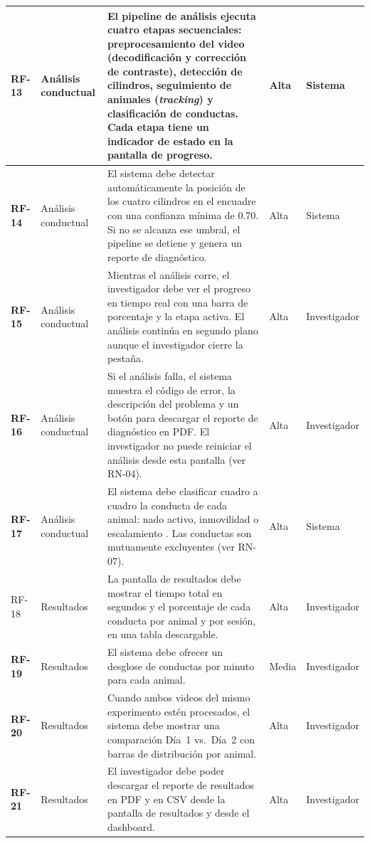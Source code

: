 \begin{longtable}{|>{\bfseries}p{1.1cm}|p{2.0cm}|p{6.7cm}|p{1.3cm}|p{1.7cm}|}
RF-13 & Análisis conductual
      & El pipeline de análisis ejecuta cuatro etapas secuenciales: preprocesamiento
        del video (decodificación y corrección de contraste), detección de cilindros,
        seguimiento de animales (\textit{tracking}) y clasificación de conductas.
        Cada etapa tiene un indicador de estado en la pantalla de progreso.
      & Alta & Sistema \\
\hline
RF-14 & Análisis conductual
      & El sistema debe detectar automáticamente la posición de los cuatro cilindros
        en el encuadre con una confianza mínima de 0.70. Si no se alcanza ese umbral,
        el pipeline se detiene y genera un reporte de diagnóstico.
      & Alta & Sistema \\
\hline
RF-15 & Análisis conductual
      & Mientras el análisis corre, el investigador debe ver el progreso en tiempo
        real con una barra de porcentaje y la etapa activa. El análisis continúa
        en segundo plano aunque el investigador cierre la pestaña.
      & Alta & Investigador \\
\hline
RF-16 & Análisis conductual
      & Si el análisis falla, el sistema muestra el código de error, la descripción
        del problema y un botón para descargar el reporte de diagnóstico en PDF.
        El investigador no puede reiniciar el análisis desde esta pantalla (ver RN-04).
      & Alta & Investigador \\
\hline
RF-17 & Análisis conductual
      & El sistema debe clasificar cuadro a cuadro la conducta de cada animal: nado
        activo, inmovilidad o escalamiento \cite{armario2021}. Las conductas son
        mutuamente excluyentes (ver RN-07).
      & Alta & Sistema \\
\hline

RF-18 & Resultados
      & La pantalla de resultados debe mostrar el tiempo total en segundos y el
        porcentaje de cada conducta por animal y por sesión, en una tabla
        descargable.
      & Alta & Investigador \\
\hline
RF-19 & Resultados
      & El sistema debe ofrecer un desglose de conductas por minuto para cada animal.
      & Media & Investigador \\
\hline
RF-20 & Resultados
      & Cuando ambos videos del mismo experimento estén procesados, el sistema debe
        mostrar una comparación Día~1 vs.\ Día~2 con barras de distribución por
        animal.
      & Alta & Investigador \\
\hline
RF-21 & Resultados
      & El investigador debe poder descargar el reporte de resultados en PDF y en
        CSV desde la pantalla de resultados y desde el dashboard.
      & Alta & Investigador \\
\hline


\end{longtable}
